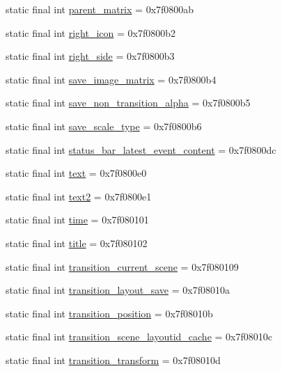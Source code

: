 \begin{DoxyCompactItemize}
\item 
static final int \mbox{\hyperlink{classandroid_1_1support_1_1transition_1_1R_1_1id_acab020b8ca2cbd92c45c2229e7b00179}{parent\+\_\+matrix}} = 0x7f0800ab
\item 
static final int \mbox{\hyperlink{classandroid_1_1support_1_1transition_1_1R_1_1id_a9755609f3032042fe7e83172281f4006}{right\+\_\+icon}} = 0x7f0800b2
\item 
static final int \mbox{\hyperlink{classandroid_1_1support_1_1transition_1_1R_1_1id_a96d440979b8fc848595de58aee89e4a4}{right\+\_\+side}} = 0x7f0800b3
\item 
static final int \mbox{\hyperlink{classandroid_1_1support_1_1transition_1_1R_1_1id_acab4a6d9fd322d835040991ed5709099}{save\+\_\+image\+\_\+matrix}} = 0x7f0800b4
\item 
static final int \mbox{\hyperlink{classandroid_1_1support_1_1transition_1_1R_1_1id_a455fe1ba61028d91040bd0b7434c275a}{save\+\_\+non\+\_\+transition\+\_\+alpha}} = 0x7f0800b5
\item 
static final int \mbox{\hyperlink{classandroid_1_1support_1_1transition_1_1R_1_1id_ad2b7283595e0f3038bc3ee7843eac9ba}{save\+\_\+scale\+\_\+type}} = 0x7f0800b6
\item 
static final int \mbox{\hyperlink{classandroid_1_1support_1_1transition_1_1R_1_1id_acfb2aa3e29c13d20946856ba1774a9e2}{status\+\_\+bar\+\_\+latest\+\_\+event\+\_\+content}} = 0x7f0800dc
\item 
static final int \mbox{\hyperlink{classandroid_1_1support_1_1transition_1_1R_1_1id_ac4cca2465737e7f17495b03f308e5bc8}{text}} = 0x7f0800e0
\item 
static final int \mbox{\hyperlink{classandroid_1_1support_1_1transition_1_1R_1_1id_a0e51e599d4bbbbe0d0016d57657ce04d}{text2}} = 0x7f0800e1
\item 
static final int \mbox{\hyperlink{classandroid_1_1support_1_1transition_1_1R_1_1id_a74264c86583c1f10acdd11d3f2c08e7e}{time}} = 0x7f080101
\item 
static final int \mbox{\hyperlink{classandroid_1_1support_1_1transition_1_1R_1_1id_ac37d5257839f0ecba0fac3657bd6b198}{title}} = 0x7f080102
\item 
static final int \mbox{\hyperlink{classandroid_1_1support_1_1transition_1_1R_1_1id_aef3ea53ee761d0649374566d52e85781}{transition\+\_\+current\+\_\+scene}} = 0x7f080109
\item 
static final int \mbox{\hyperlink{classandroid_1_1support_1_1transition_1_1R_1_1id_a0da519ef0e965f22493e434e46d6b368}{transition\+\_\+layout\+\_\+save}} = 0x7f08010a
\item 
static final int \mbox{\hyperlink{classandroid_1_1support_1_1transition_1_1R_1_1id_a382451efc0f4b0eb63a180489417e330}{transition\+\_\+position}} = 0x7f08010b
\item 
static final int \mbox{\hyperlink{classandroid_1_1support_1_1transition_1_1R_1_1id_a38d13adf0b16756ebfc96af4df5a4e7b}{transition\+\_\+scene\+\_\+layoutid\+\_\+cache}} = 0x7f08010c
\item 
static final int \mbox{\hyperlink{classandroid_1_1support_1_1transition_1_1R_1_1id_a262eee6539d89b6200234e0c27e5d384}{transition\+\_\+transform}} = 0x7f08010d
\end{DoxyCompactItemize}


